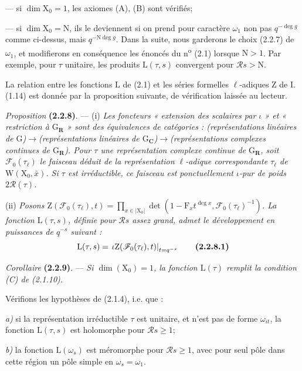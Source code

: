 \documentclass[11pt,leqno]{article}
\begin{document}
— si \(\dim\mathrm X_0=1\), les axiomes (A), (B) sont vérifiés;

— si \(\dim\mathrm X_0=\mathrm N\), ils le deviennent si on prend pour caractère \(\omega_1\) non pas \(q^{-\deg g}\) comme ci-dessus, mais \(q^{-\mathrm N\deg g}\). Dans la suite, nous garderons le choix (2.2.7) de \(\omega_1\), et modifierons en conséquence les énoncés du n\textsuperscript{o} (2.1) lorsque \(\mathrm N>1\). Par exemple, pour \(\tau\) unitaire, les produits \(\mathrm L(\tau,s)\) convergent pour \(\mathscr R s>\mathrm N\).

La relation entre les fonctions \(\mathrm L\) de (2.1) et les séries formelles \(\ell\)-adiques \(\mathrm Z\) de I.\,(1.14) est donnée par la proposition suivante, de vérification laissée au lecteur.

\textit{Proposition} \textbf{(2.2.8)}. — (i) \textit{Les foncteurs « extension des scalaires par \(\iota\) » et « restriction à \(\mathrm G_{\mathbf R}\) » sont des équivalences de catégories : (représentations linéaires de \(\mathrm G\))\(\to\)(représentations linéaires de \(\mathrm G_{\mathbf C}\))\(\to\)(représentations complexes continues de \(\mathrm G_{\mathbf R}\)). Pour \(\tau\) une représentation complexe continue de \(\mathrm G_{\mathbf R}\), soit \(\mathscr F_0(\tau_\ell)\) le faisceau déduit de la représentation \(\ell\)-adique correspondante \(\tau_\ell\) de \(\mathrm W(\mathrm X_0,\bar{x})\). Si \(\tau\) est irréductible, ce faisceau est ponctuellement \(\iota\)-pur de poids \(2\mathscr R(\tau)\).}

(ii) \textit{Posons \(\mathrm Z(\mathscr F_0(\tau_\ell),t)=\prod\limits_{x\in|\mathrm X_0|}\det(1-\mathrm F_xt^{\deg x},\mathscr F_0(\tau_\ell)^{-1})\). La fonction \(\mathrm L(\tau,s)\), définie pour \(\mathscr R s\) assez grand, admet le développement en puissances de \(q^{-s}\) suivant :}
\[
\mathrm L(\tau,s)
=\left.\iota\mathrm Z(\mathscr F_0(\tau_\ell),t)\right|_{t=q^{-s}}
\tag*{\textbf{(2.2.8.1)}}
\]

\textit{Corollaire} \textbf{(2.2.9)}. — \textit{Si \(\dim(\mathrm X_0)=1\), la fonction \(\mathrm L(\tau)\) remplit la condition \textup{(C)} de \textup{(2.1.10)}.}

Vérifions les hypothèses de (2.1.4), i.e. que :

\textit{a)} si la représentation irréductible \(\tau\) est unitaire, et n’est pas de forme \(\omega_{it}\), la fonction \(\mathrm L(\tau,s)\) est holomorphe pour \(\mathscr R s\geq1\);

\textit{b)} la fonction \(\mathrm L(\omega_s)\) est méromorphe pour \(\mathscr R s\geq1\), avec pour seul pôle dans cette région un pôle simple en \(\omega_s=\omega_1\).
\end{document}
